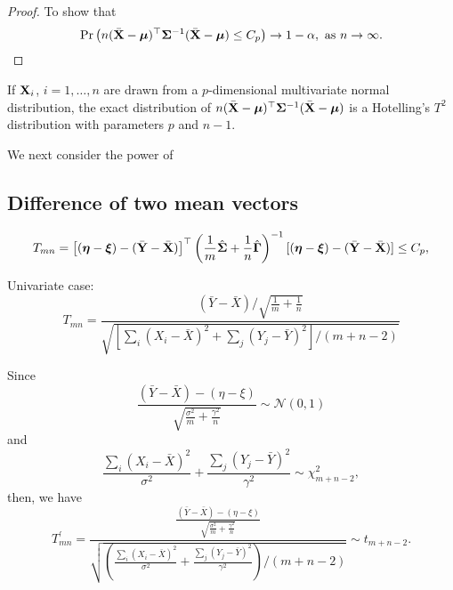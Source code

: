 \begin{proof}
	To show that
	\begin{equation*}
		\Pr\left(n(\bar{\bfX}-\bfmu)^{\top}\bfSigma^{-1}(\bar{\bfX}-\bfmu)\leq C_{p}\right)\rightarrow1-\alpha,\ \text{as}\ n\rightarrow\infty.
	\end{equation*}
\end{proof}

\begin{remark}
	If ${\bf X}_{i}$, $i=1,\ldots,n$ are drawn from a $p$-dimensional multivariate normal distribution, the exact distribution of $n(\bar{{\bf X}}-\boldsymbol{\mu})^{\top}\boldsymbol{\Sigma}^{-1}(\bar{{\bf X}}-\boldsymbol{\mu})$ is a Hotelling's $T^{2}$ distribution with parameters $p$ and $n-1$.
\end{remark}

We next consider the power of

\subsection{Difference of two mean vectors}

\begin{equation*}
	T_{mn}=\left[(\boldsymbol{\eta}-\boldsymbol{\xi})-(\bar{{\bf Y}}-\bar{{\bf X}})\right]^{\top}\left(\frac{1}{m}\hat{\boldsymbol{\Sigma}}+\frac{1}{n}\hat{\boldsymbol{\Gamma}}\right)^{-1}[(\boldsymbol{\eta}-\boldsymbol{\xi})-(\bar{{\bf Y}}-\bar{{\bf X}})]\leq C_{p},
\end{equation*}

Univariate case:
\begin{equation*}
	T_{mn}=\frac{(\bar{Y}-\bar{X})/\sqrt{\frac{1}{m}+\frac{1}{n}}}{\sqrt{\left[\sum_{i}\left(X_i-\bar{X}\right)^2+\sum_{j}\left(Y_j-\bar{Y}\right)^2\right]/(m+n-2)}}
\end{equation*}

Since
\begin{equation*}
	\frac{(\bar{Y}-\bar{X})-(\eta-\xi)}{\sqrt{\frac{\sigma^{2}}{m}+\frac{\gamma^{2}}{n}}}\sim\mathcal{N}(0,1)
\end{equation*}
and
\begin{equation*}
	\frac{\sum_{i}\left(X_i-\bar{X}\right)^2}{\sigma^{2}}+\frac{\sum_{j}\left(Y_j-\bar{Y}\right)^2}{\gamma^{2}}\sim\chi^{2}_{m+n-2},
\end{equation*}
then, we have
\begin{equation*}
	T_{mn}^{\prime}=\frac{\frac{(\bar{Y}-\bar{X})-(\eta-\xi)}{\sqrt{\frac{\sigma^{2}}{m}+\frac{\gamma^{2}}{n}}}}{\sqrt{\left(\frac{\sum_{i}\left(X_i-\bar{X}\right)^2}{\sigma^{2}}+\frac{\sum_{j}\left(Y_j-\bar{Y}\right)^2}{\gamma^{2}}\right)/(m+n-2)}}\sim t_{m+n-2}.
\end{equation*}

